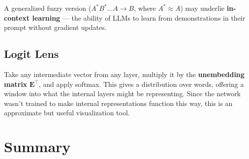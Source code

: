 \documentclass[main.tex]{subfiles}
\begin{document}
A generalized fuzzy version ($A^* B^* \ldots A \to B$, where $A^* \approx A$) may underlie \textbf{in-context learning} --- the ability of LLMs to learn from demonstrations in their prompt without gradient updates.

\subsection{Logit Lens}

Take any intermediate vector from any layer, multiply it by the \textbf{unembedding matrix} $\mathbf{E}^\top$, and apply softmax. This gives a distribution over words, offering a window into what the internal layers might be representing. Since the network wasn't trained to make internal representations function this way, this is an approximate but useful visualization tool.

\section{Summary}

\begin{center}
\end{center}
\end{document}
